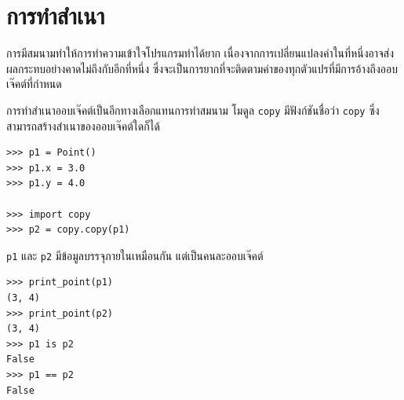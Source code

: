 \section{การทำสำเนา} %
\label{copying}


การมีสมนามทำให้การทำความเข้าใจโปรแกรมทำได้ยาก เนื่องจากการเปลี่ยนแปลงค่าในที่หนึ่งอาจส่งผลกระทบอย่างคาดไม่ถึงกับอีกที่หนึ่ง 
ซึ่งจะเป็นการยากที่จะติดตามค่าของทุกตัวแปรที่มีการอ้างถึงออบเจ๊คต์ที่กำหนด



การทำสำเนาออบเจ๊คต์เป็นอีกทางเลือกแทนการทำสมนาม โมดูล {\tt copy} มีฟังก์ชันชื่อว่า {\tt copy} ซึ่งสามารถสร้างสำเนาของออบเจ๊คต์ใดก็ได้

\begin{verbatim}
>>> p1 = Point()
>>> p1.x = 3.0
>>> p1.y = 4.0

>>> import copy
>>> p2 = copy.copy(p1)
\end{verbatim}
%

{\tt p1} และ {\tt p2} มีข้อมูลบรรจุภายในเหมือนกัน แต่เป็นคนละออบเจ๊คต์

\begin{verbatim}
>>> print_point(p1)
(3, 4)
>>> print_point(p2)
(3, 4)
>>> p1 is p2
False
>>> p1 == p2
False
\end{verbatim}
%

